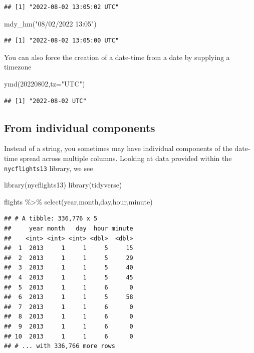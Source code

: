 \documentclass[
]{book}
\newenvironment{Shaded}{\begin{snugshade}}{\end{snugshade}}
\newcommand{\AttributeTok}[1]{\textcolor[rgb]{0.77,0.63,0.00}{#1}}
\newcommand{\DecValTok}[1]{\textcolor[rgb]{0.00,0.00,0.81}{#1}}
\newcommand{\FunctionTok}[1]{\textcolor[rgb]{0.00,0.00,0.00}{#1}}
\newcommand{\NormalTok}[1]{#1}
\newcommand{\SpecialCharTok}[1]{\textcolor[rgb]{0.00,0.00,0.00}{#1}}
\newcommand{\StringTok}[1]{\textcolor[rgb]{0.31,0.60,0.02}{#1}}
\begin{document}
\begin{verbatim}
## [1] "2022-08-02 13:05:02 UTC"
\end{verbatim}

\begin{Shaded}
\begin{Highlighting}[]
\FunctionTok{mdy\_hm}\NormalTok{(}\StringTok{"08/02/2022 13:05"}\NormalTok{)}
\end{Highlighting}
\end{Shaded}

\begin{verbatim}
## [1] "2022-08-02 13:05:00 UTC"
\end{verbatim}

You can also force the creation of a date-time from a date by supplying a timezone

\begin{Shaded}
\begin{Highlighting}[]
\FunctionTok{ymd}\NormalTok{(}\DecValTok{20220802}\NormalTok{,}\AttributeTok{tz=}\StringTok{"UTC"}\NormalTok{)}
\end{Highlighting}
\end{Shaded}

\begin{verbatim}
## [1] "2022-08-02 UTC"
\end{verbatim}

\hypertarget{from-individual-components}{%
\subsection{From individual components}\label{from-individual-components}}

Instead of a string, you sometimes may have individual components of the date-time spread across multiple columns. Looking at data provided within the \texttt{nycflights13} library, we see

\begin{Shaded}
\begin{Highlighting}[]
\FunctionTok{library}\NormalTok{(nycflights13)}
\FunctionTok{library}\NormalTok{(tidyverse)}

\NormalTok{flights }\SpecialCharTok{\%\textgreater{}\%}
  \FunctionTok{select}\NormalTok{(year,month,day,hour,minute)}
\end{Highlighting}
\end{Shaded}

\begin{verbatim}
## # A tibble: 336,776 x 5
##     year month   day  hour minute
##    <int> <int> <int> <dbl>  <dbl>
##  1  2013     1     1     5     15
##  2  2013     1     1     5     29
##  3  2013     1     1     5     40
##  4  2013     1     1     5     45
##  5  2013     1     1     6      0
##  6  2013     1     1     5     58
##  7  2013     1     1     6      0
##  8  2013     1     1     6      0
##  9  2013     1     1     6      0
## 10  2013     1     1     6      0
## # ... with 336,766 more rows
\end{verbatim}
\end{document}

